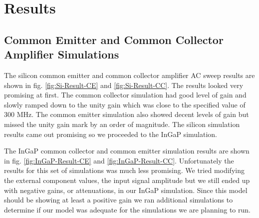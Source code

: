 \documentclass[conference]{IEEEtran}
\begin{document}
\section{Results}

\subsection{Common Emitter and Common Collector Amplifier Simulations}

The silicon common emitter and common collector amplifier AC sweep results are shown in fig. \ref{fig:Si-Result-CE} and \ref{fig:Si-Result-CC}.
The results looked very promising at first. The common collector simulation had good level of gain and slowly ramped down to the unity gain
which was close to the specified value of 300 MHz. The common emitter simulation also showed decent levels of gain but missed the unity
gain mark by an order of magnitude. The silicon simulation results came out promising so we proceeded to the InGaP simulation.

The InGaP common collector and common emitter simulation results are shown in fig. \ref{fig:InGaP-Result-CE} and \ref{fig:InGaP-Result-CC}.
Unfortunately the results for this set of simulations was much less promising. We tried modifying the external component values, the input
signal amplitude but we still ended up with negative gains, or attenuations, in our InGaP simulation. Since this model should be showing at least
a positive gain we ran additional simulations to determine if our model was adequate for the simulations we are planning to run.
\end{document}
